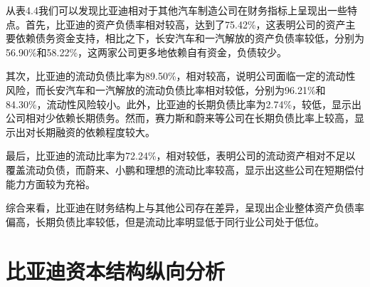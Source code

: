 从表4.4我们可以发现比亚迪相对于其他汽车制造公司在财务指标上呈现出一些特点。首先，比亚迪的资产负债率相对较高，达到了75.42\%，这表明公司的资产主要依赖债务资金支持，相比之下，长安汽车和一汽解放的资产负债率较低，分别为56.90\%和58.22\%，这两家公司更多地依赖自有资金，负债较少。

其次，比亚迪的流动负债比率为89.50\%，相对较高，说明公司面临一定的流动性风险，而长安汽车和一汽解放的流动负债比率相对较低，分别为96.21\%和84.30\%，流动性风险较小。此外，比亚迪的长期负债比率为2.74\%，较低，显示出公司相对少依赖长期债务。然而，赛力斯和蔚来等公司在长期负债比率上较高，显示出对长期融资的依赖程度较大。

最后，比亚迪的流动比率为72.24\%，相对较低，表明公司的流动资产相对不足以覆盖流动负债，而蔚来、小鹏和理想的流动比率较高，显示出这些公司在短期偿付能力方面较为充裕。

综合来看，比亚迪在财务结构上与其他公司存在差异，呈现出企业整体资产负债率偏高，长期负债比率较低，但是流动比率明显低于同行业公司处于低位。
\section{比亚迪资本结构纵向分析}


